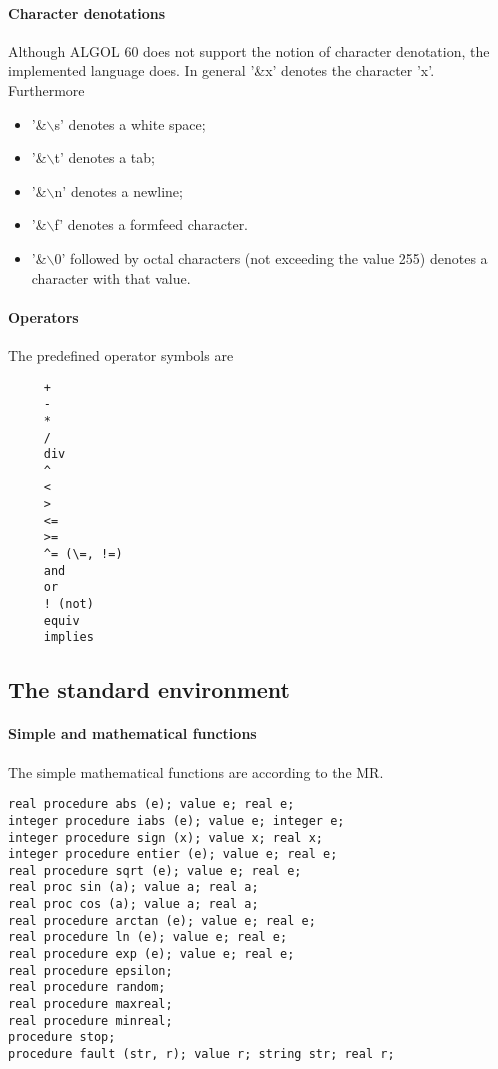 \documentclass[11pt]{article}
\begin{document}
\paragraph{Character denotations}
Although ALGOL 60 does not support the notion of character denotation, the implemented language does. In general '\&x' denotes the character 'x'. Furthermore
\begin{itemize}
\item '\&$\backslash$s' denotes a white space;
\item '\&$\backslash$t' denotes a tab;
\item '\&$\backslash$n' denotes a newline;
\item '\&$\backslash$f' denotes a formfeed character.
\item '\&$\backslash$0' followed by octal characters (not exceeding the value 255) denotes a character with that value.
\end{itemize}
\paragraph{Operators}
The predefined operator symbols are
{\footnotesize
\begin{verbatim}
     +
     -
     *
     /
     div
     ^ 
     <
     >
     <=
     >=
     ^= (\=, !=)
     and
     or
     ! (not)
     equiv
     implies
\end{verbatim}
}
\subsection{The standard environment}

\paragraph{Simple and mathematical functions}
The simple mathematical functions are according to the MR.
{\footnotesize
\begin{verbatim}
real procedure abs (e); value e; real e; 
integer procedure iabs (e); value e; integer e; 
integer procedure sign (x); value x; real x; 
integer procedure entier (e); value e; real e; 
real procedure sqrt (e); value e; real e; 
real proc sin (a); value a; real a; 
real proc cos (a); value a; real a; 
real procedure arctan (e); value e; real e; 
real procedure ln (e); value e; real e; 
real procedure exp (e); value e; real e; 
real procedure epsilon; 
real procedure random; 
real procedure maxreal; 
real procedure minreal; 
procedure stop; 
procedure fault (str, r); value r; string str; real r; 
\end{verbatim}
}
\end{document}

